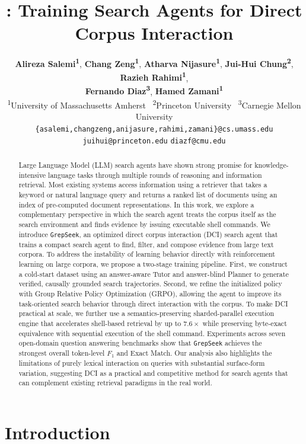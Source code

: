 \documentclass{article} %
\title{\ourmethod{}: Training Search Agents for Direct Corpus Interaction}
\author{
\textbf{Alireza Salemi\textsuperscript{1}}, \textbf{Chang Zeng\textsuperscript{1}}, \textbf{Atharva Nijasure\textsuperscript{1}}, \textbf{Jui-Hui Chung\textsuperscript{2}}, \textbf{Razieh Rahimi\textsuperscript{1}},\\
\textbf{Fernando Diaz\textsuperscript{3}}, \textbf{Hamed Zamani\textsuperscript{1}} \\
  \vspace{0.25cm}
  \textsuperscript{1}University of Massachusetts Amherst \,
  \textsuperscript{2}Princeton University \, \textsuperscript{3}Carnegie Mellon University \\
  \vspace{0.15cm}
  \texttt{\{asalemi,changzeng,anijasure,rahimi,zamani\}@cs.umass.edu} \\
  \texttt{juihui@princeton.edu} \quad \texttt{diazf@cmu.edu}
}
\newcommand{\ourmethod}{\texttt{GrepSeek}\xspace}
\begin{document}
\maketitle

\begin{abstract}

Large Language Model (LLM) search agents have shown strong promise for knowledge-intensive language tasks through multiple rounds of reasoning and information retrieval. Most existing systems access information using a retriever that takes a keyword or natural language query and returns a ranked list of documents using an index of pre-computed document representations. In this work, we explore a complementary perspective in which the search agent treats the corpus itself as the search environment and finds evidence by issuing executable shell commands. We introduce \ourmethod{}, an optimized direct corpus interaction (DCI) search agent that trains a compact search agent to find, filter, and compose evidence from large text corpora. To address the instability of learning behavior directly with reinforcement learning on large corpora, we propose a two-stage training pipeline. First, we construct a cold-start dataset using an answer-aware Tutor and answer-blind Planner to generate verified, causally grounded search trajectories. Second, we refine the initialized policy with Group Relative Policy Optimization (GRPO), allowing the agent to improve its task-oriented search behavior through direct interaction with the corpus. To make DCI practical at scale, we further use a semantics-preserving sharded-parallel execution engine that accelerates shell-based retrieval by up to $7.6\times$ while preserving byte-exact equivalence with sequential execution of the shell command. Experiments across seven open-domain question answering benchmarks show that \ourmethod{} achieves the strongest overall token-level $F_1$ and Exact Match. Our analysis also highlights the limitations of purely lexical interaction on queries with substantial surface-form variation, suggesting DCI as a practical and competitive method for search agents that can complement existing retrieval paradigms in the real world.

\end{abstract}

\section{Introduction}
\end{document}
